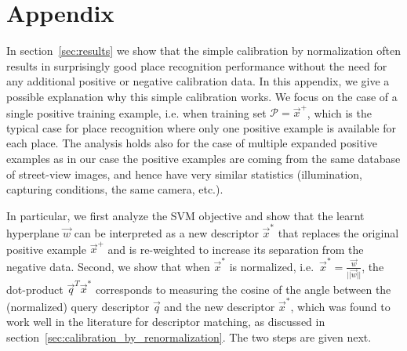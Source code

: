   \section*{Appendix} %
    In section~\ref{sec:results} we show that the simple calibration by normalization often results in surprisingly good place recognition performance without the need for any additional positive or negative calibration data. In this \textcolor{petr}{appendix}, we give a possible explanation why this simple calibration works.  We focus on the case of a single positive training example, i.e. when training set $\mathcal P = \vec{x}^{+}$, which is the typical case for place recognition where only one 
    \textcolor{petr}{positive example is available for each place. The analysis holds also for the case of multiple expanded positive examples as in our case the positive examples are coming from the same database of street-view images, and hence have very similar statistics (illumination, capturing conditions, the same camera, etc.)}. 

    In particular, we first analyze the SVM objective and show that the learnt hyperplane $\vec{w}$ can be interpreted as a new descriptor $\vec{x}^{*}$ that replaces the original positive example $\vec{x}^{+}$ and is re-weighted to increase its separation from the negative data. 
    Second, we show that when $\vec{x}^{*}$ is normalized, i.e.\  $\vec{x}^{*} = \frac{\vec{w}}{||\vec{w}||}$, the dot-product $\vec{q}^T\vec{x}^*$ corresponds to measuring the cosine of the angle between the (normalized) query descriptor $\vec{q}$  and the new descriptor $\vec{x}^{*}$, which was found to work well in the literature for descriptor matching, as discussed in section~\ref{sec:calibration_by_renormalization}. The two steps are given next.  
    

